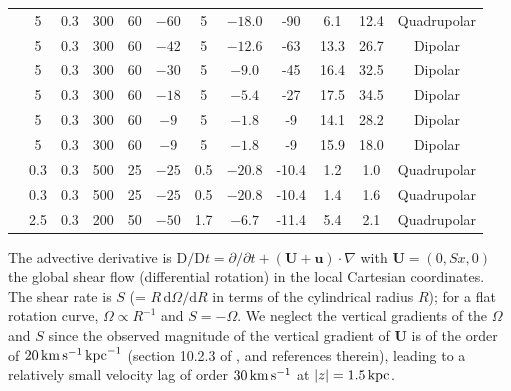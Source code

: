 \documentclass[fleqn,usenatbib]{mnras}
\newcommand{\RSOBSA}{{\sf{O60}}}
\newcommand{\RSOBSB}{{\sf{O60q0.7}}}
\newcommand{\RSOBSC}{{\sf{O60q0.5}}}
\newcommand{\RSOBSD}{{\sf{O60q0.3}}}
\newcommand{\CM}{{\sf{O60q0.3cr}}}
\newcommand{\RSOBSE}{{\sf{O60q0.1}}}
\newcommand{\RAOASA}{{\sf{G25}}}
\newcommand{\RAOASACM}{{\sf{G25cr}}}
\newcommand{\RBOASACM}{{\sf{G50cr}}}
\newcommand{\dd}{\mathrm{d}}        %
\renewcommand\vec[1]{\bm{#1}}%
\newcommand{\km}{\,{\rm km}}    %
\newcommand{\kpc}{\,{\rm kpc}}  %
\newcommand{\s}{\,{\rm s}}      %
\newcommand{\kms}{\km\s^{-1}}    %
\begin{document}
\begin{table}
\begin{tabular}{l|ccccc|ccc|ccc}
 \RSOBSA  &5           & 0.3                 &300       &60                         &   $-60$                   &    5     &   $-18.0$& -90  & 6.1        &   12.4      &    Quadrupolar \\
 \RSOBSB  &5           & 0.3                 &300       &60                         &   $-42$                   &    5     &   $-12.6$& -63  & 13.3       &   26.7      &    Dipolar     \\
 \RSOBSC  &5           & 0.3                 &300       &60                         &   $-30$                   &    5     &   $-9.0$ & -45  & 16.4       &   32.5      &    Dipolar     \\
 \RSOBSD  &5           & 0.3                 &300       &60                         &   $-18$                   &    5     &   $-5.4$ & -27  & 17.5       &   34.5      &    Dipolar     \\
 \RSOBSE  &5           & 0.3                 &300       &60                         &   $-9$                    &    5     &   $-1.8$ & -9   & 14.1       &   28.2      &    Dipolar     \\
 \CM      &5           & 0.3                 &300       &60                         &   $-9$                    &    5     &   $-1.8$ & -9   & 15.9       &   18.0      &    Dipolar     \\
 \RAOASA  &0.3         & 0.3                 &500       &25                         &   $-25$                   &    0.5   &   $-20.8$& -10.4& 1.2        &   1.0      &    Quadrupolar \\
 \RAOASACM&0.3         & 0.3                 &500       &25                         &   $-25$                   &    0.5   &   $-20.8$& -10.4& 1.4        &   1.6      &    Quadrupolar \\
 \RBOASACM&2.5         & 0.3                 &200       &50                         &   $-50$                   &    1.7   &   $-6.7$ & -11.4& 5.4        &   2.1       &    Quadrupolar \\
\cline{1-12}
\end{tabular}
    \label{tab:sims}
\end{table}

The advective derivative is $\text{D}/\text{D}t= \partial/\partial t +
(\vec{U}+\vec{u})\cdot\nabla$ with $\vec{U} = (0,Sx,0)$ the global shear flow
(differential rotation) in the local Cartesian coordinates.  The shear rate is
$S$ (= $R\,\dd\Omega/\dd R$ in terms of the cylindrical radius $R$); for a flat
rotation curve, $\Omega \propto R^{-1}$ and $S = -\Omega$. We neglect the
vertical gradients of the $\Omega$ and $S$ since the observed magnitude of the
vertical gradient of $\vec{U}$ is of the order of $20 \kms \kpc^{-1}$ (section
10.2.3 of \citealt{SS21}, and references therein), leading to a relatively
small velocity lag of order $30\kms$ at $|z| = 1.5 \kpc$.
\end{document}

